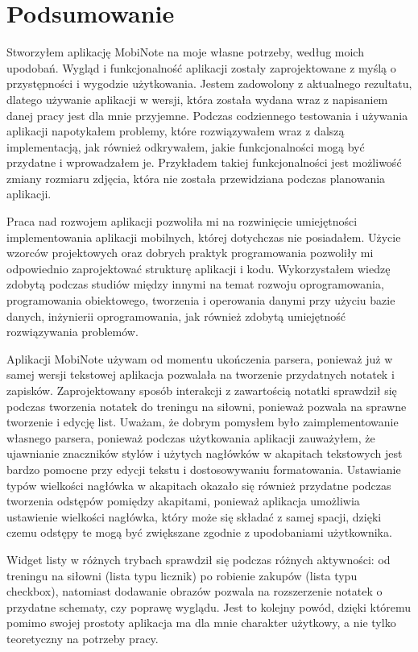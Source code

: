 

\chapter{Podsumowanie}

Stworzyłem aplikację MobiNote na moje własne potrzeby, według moich upodobań. Wygląd i funkcjonalność aplikacji zostały zaprojektowane z myślą o przystępności i wygodzie użytkowania. Jestem zadowolony z aktualnego rezultatu, dlatego używanie aplikacji w wersji, która została wydana wraz z napisaniem danej pracy jest dla mnie przyjemne. Podczas codziennego testowania i używania aplikacji napotykałem problemy, które rozwiązywałem wraz z dalszą implementacją, jak również odkrywałem, jakie funkcjonalności mogą być przydatne i wprowadzałem je. Przykładem takiej funkcjonalności jest możliwość zmiany rozmiaru zdjęcia, która nie została przewidziana podczas planowania aplikacji.

Praca nad rozwojem aplikacji pozwoliła mi na rozwinięcie umiejętności implementowania aplikacji mobilnych, której dotychczas nie posiadałem. Użycie wzorców projektowych oraz dobrych praktyk programowania pozwoliły mi odpowiednio zaprojektować strukturę aplikacji i kodu. Wykorzystałem wiedzę zdobytą podczas studiów między innymi na temat rozwoju oprogramowania, programowania obiektowego, tworzenia i operowania danymi przy użyciu bazie danych, inżynierii oprogramowania, jak również zdobytą umiejętność rozwiązywania problemów.

Aplikacji MobiNote używam od momentu ukończenia parsera, ponieważ już w samej wersji tekstowej aplikacja pozwalała na tworzenie przydatnych notatek i zapisków.
Zaprojektowany sposób interakcji z zawartością notatki sprawdził się podczas tworzenia notatek do treningu na siłowni, ponieważ pozwala na sprawne tworzenie i edycję list. Uważam, że dobrym pomysłem było zaimplementowanie własnego parsera, ponieważ podczas użytkowania aplikacji zauważyłem, że ujawnianie znaczników stylów i użytych nagłówków w akapitach tekstowych jest bardzo pomocne przy edycji tekstu i dostosowywaniu formatowania. Ustawianie typów wielkości nagłówka w akapitach okazało się również przydatne podczas tworzenia odstępów pomiędzy akapitami, ponieważ aplikacja umożliwia ustawienie wielkości nagłówka, który może się składać z samej spacji, dzięki czemu odstępy te mogą być zwiększane zgodnie z upodobaniami użytkownika.

Widget listy w różnych trybach sprawdził się podczas różnych aktywności: od treningu na siłowni (lista typu licznik) po robienie zakupów (lista typu checkbox), natomiast dodawanie obrazów pozwala na rozszerzenie notatek o przydatne schematy, czy poprawę wyglądu. Jest to kolejny powód, dzięki któremu pomimo swojej prostoty aplikacja ma dla mnie charakter użytkowy, a nie tylko teoretyczny na potrzeby pracy.

